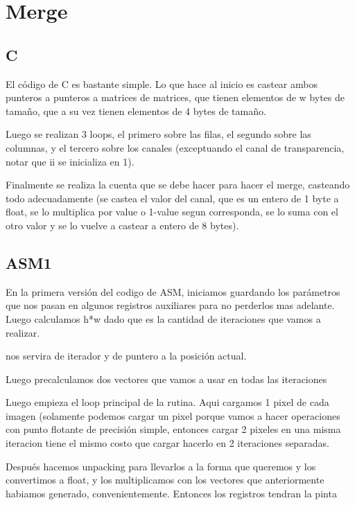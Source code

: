 \section{Merge}

\subsection{C}
El código de C es bastante simple. Lo que hace al inicio es castear ambos punteros a punteros a matrices de matrices, que tienen elementos de w bytes de tamaño, que a su vez tienen elementos de 4 bytes de tamaño.

Luego se realizan 3 loops, el primero sobre las filas, el segundo sobre las columnas, y el tercero sobre los canales (exceptuando el canal de transparencia, notar que ii se inicializa en 1).

Finalmente se realiza la cuenta que se debe hacer para hacer el merge, casteando todo adecuadamente (se castea el valor del canal, que es un entero de 1 byte a float, se lo multiplica por value o 1-value segun corresponda, se lo suma con el otro valor y se lo vuelve a castear a entero de 8 bytes).

\subsection{ASM1}

En la primera versión del codigo de ASM, iniciamos guardando los parámetros que nos pasan en algunos registros auxiliares para no perderlos mas adelante.
Luego calculamos h*w dado que es la cantidad de iteraciones que vamos a realizar.

\rcx nos servira de iterador y \rbx de puntero a la posición actual.

Luego precalculamos dos vectores que vamos a usar en todas las iteraciones




Luego empieza el loop principal de la rutina. Aqui cargamos 1 pixel de cada imagen (solamente podemos cargar un pixel porque vamos a hacer operaciones con punto flotante de precisión simple, entonces cargar 2 pixeles en una misma iteracion tiene el mismo costo que cargar hacerlo en 2 iteraciones separadas.

Después hacemos unpacking para llevarlos a la forma que queremos y los convertimos a float, y los multiplicamos con los vectores que anteriormente habiamos generado, convenientemente. Entonces los registros tendran la pinta

